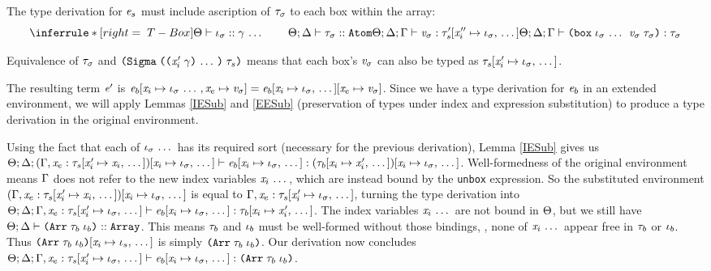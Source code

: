 \begin{sproof}
  The type derivation for $\mathit{e}_s$ must include
  ascription of $\mathit{\tau}_\sigma$ to each box within the array:
  \[{\infr[T-Box]
    {\sequence{\sortof{\sEnv}{\idx_\sigma}{\sort}}
      \qquad
      {\kindof{\sEnv}{\kEnv}{\type_\sigma}{\kindatom}}
      \\
      \typeof{\sEnv}{\kEnv}{\tEnv}{\val_\sigma}{\seqsubst{\type_s'}{\var_i''}{\idx_\sigma}}}
    {\typeof{\sEnv}{\kEnv}{\tEnv}
      {\dsum{\sequence{\idx_\sigma}}{\val_\sigma}{\type_\sigma}}
      {\type_\sigma}}}\]

  Equivalence of $\mathit{\tau}_\sigma$ and $\typedsum{\sequence{\notevar{\var_i'}{\sort}}}{\type_s}$
  means that each box's $\mathit{v}_\sigma$ can also be typed as $\mathit{\tau}_s\hspace{-2pt}\left[ \mathit{x}_i' \mapsto \mathit{\iota}_\sigma, \, \ldots \, \right]$.

  The resulting term $\mathit{e}'$ is
  $\mathit{e}_b\hspace{-2pt}\left[ \mathit{x}_i \mapsto \mathit{\iota}_\sigma \, \ldots \,,\mathit{x}_e \mapsto \mathit{v}_\sigma \right]
  = \mathit{e}_b\hspace{-2pt}\left[ \mathit{x}_i \mapsto \mathit{\iota}_\sigma, \, \ldots \, \right]\hspace{-2pt}\left[ \mathit{x}_e \mapsto \mathit{v}_\sigma \right]$.
  Since we have a type derivation for $\mathit{e}_b$ in an extended environment,
  we will apply Lemmas \ref{IESub} and \ref{EESub}
  (preservation of types under index and expression substitution)
  to produce a type derivation in the original environment.

  Using the fact that each of $\mathit{\iota}_\sigma \, \ldots \,$ has its required sort
  (necessary for the previous derivation),
  Lemma \ref{IESub} gives us
  $\Theta;\Delta;\left( \Gamma, \mathit{x}_e : \mathit{\tau}_s\hspace{-2pt}\left[ \mathit{x}_i' \mapsto \mathit{x}_i, \, \ldots \, \right] \right)\hspace{-2pt}\left[ \mathit{x}_i \mapsto \mathit{\iota}_\sigma, \, \ldots \, \right] \vdash \mathit{e}_b\hspace{-2pt}\left[ \mathit{x}_i \mapsto \mathit{\iota}_\sigma, \, \ldots \, \right] : \left( \mathit{\tau}_b\hspace{-2pt}\left[ \mathit{x}_i \mapsto \mathit{x}_i', \, \ldots \, \right] \right)\hspace{-2pt}\left[ \mathit{x}_i \mapsto \mathit{\iota}_\sigma, \, \ldots \, \right]$.
  Well-formedness of the original environment means $\Gamma$ does not refer to the
  new index variables $\mathit{x}_i \, \ldots \,$,
  which are instead bound by the {\tt unbox} expression.
  So the substituted environment
  $\left( \Gamma, \mathit{x}_e : \mathit{\tau}_s\hspace{-2pt}\left[ \mathit{x}_i' \mapsto \mathit{x}_i, \, \ldots \, \right] \right)\hspace{-2pt}\left[ \mathit{x}_i \mapsto \mathit{\iota}_\sigma, \, \ldots \, \right]$
  is equal to $\Gamma, \mathit{x}_e : \mathit{\tau}_s\hspace{-2pt}\left[ \mathit{x}_i' \mapsto \mathit{\iota}_\sigma, \, \ldots \, \right]$,
  turning the type derivation into
  $\Theta;\Delta;\Gamma, \mathit{x}_e : \mathit{\tau}_s\hspace{-2pt}\left[ \mathit{x}_i' \mapsto \mathit{\iota}_\sigma, \, \ldots \, \right] \vdash \mathit{e}_b\hspace{-2pt}\left[ \mathit{x}_i \mapsto \mathit{\iota}_\sigma, \, \ldots \, \right] : \mathit{\tau}_b\hspace{-2pt}\left[ \mathit{x}_i \mapsto \mathit{x}_i', \, \ldots \, \right]$.
  The index variables $\mathit{x}_i \, \ldots \,$ are not bound in $\Theta$,
  but we still have $\kindof{\sEnv}{\kEnv}{\typearray{\type_b}{\idx_b}}{\kindarray}$.
  This means $\mathit{\tau}_b$ and $\mathit{\iota}_b$ must be well-formed without those bindings,
  \ie, none of $\mathit{x}_i \, \ldots \,$ appear free in $\mathit{\tau}_b$ or $\mathit{\iota}_b$.
  Thus $\seqsubst{\typearray{\type_b}{\idx_b}}{\var_i}{\idx_s}$ is simply $\typearray{\type_b}{\idx_b}$.
  Our derivation now concludes
  $\typeof{\sEnv}{\kEnv}{\tEnv, \hastype{\var_e}{\seqsubst{\type_s}{\var_i'}{\idx_\sigma}}}
  {\seqsubst{\expr_b}{\var_i}{\idx_\sigma}}{\typearray{\type_b}{\idx_b}}$.


\end{sproof}
